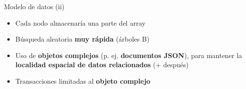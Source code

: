 \documentclass[14pt]{beamer}
\begin{document}
\begin{frame}
\begin{overlayarea}{\textwidth}{.8\textheight}
{\begin{block}{Modelo de datos (ii)}
\begin{itemize}
\begin{itemize}
\item Cada nodo almacenaría una parte del array
\item Búsqueda aleatoria {\bf muy rápida} (árboles B)
\item Uso de {\bf objetos complejos} (p. ej. {\bf documentos JSON}),
  para mantener la {\bf localidad espacial de datos relacionados} (+
  después)
\item Transacciones limitadas al {\bf objeto complejo}
\end{itemize}
\end{itemize}
\end{block}%
}%
\end{overlayarea}
\end{frame}



\end{document}
